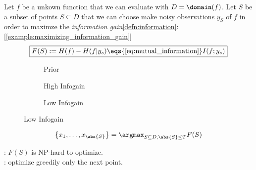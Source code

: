 \begin{sectionbox}\nospacing
  Let $f$ be a unkown function that we can evaluate with $D=\domain(f)$.
  Let $S$ be a subset of points $S\subseteq D$ that we can choose make noisy observations
  $y_{S}$ of $f$ in order to maximze the \textit{information gain}\cref{defn:information}:
  \hfill[\cref{example:maximizing_information_gain}]
  \begin{align}
    \boxed{F(S):=H(f)-H(f|y_s)\eqs{\text{\cref{eq:mutual_information}}}I(f;y_s)}\label{eq:information_gain}
  \end{align}
  \begin{figure}[H]
    \centering
    \begin{subfigure}{0.32\columnwidth}
      \centering{
        \def\svgwidth{100pt}
        \resizebox{\linewidth}{!}{}
      }
      \caption{Prior}
      \label{fig:prior}
    \end{subfigure}%
    \hfil
    \begin{subfigure}{0.32\columnwidth}
      \centering{
        \def\svgwidth{100pt}
        \resizebox{\linewidth}{!}{}
      }
      \caption{High Infogain}
      \label{fig:high}
    \end{subfigure}
    \hfil
    \begin{subfigure}{0.32\columnwidth}
      \centering{
        \def\svgwidth{100pt}
        \resizebox{\linewidth}{!}{}
      }
      \caption{Low Infogain}
      \label{fig:low}
    \end{subfigure}
  \end{figure}
\end{sectionbox}
\begin{defnbox}\nospacing
  \begin{defn}\label{defn:optimal_set_of_labels}
    \begin{align}
      \left\{x_1,\ldots,x_{\abs{S}}\right\}=\argmax_{S\subseteq D,\abs{S}\leq T}F(S)
    \end{align}
  \end{defn}
\end{defnbox}
\begin{sectionbox}\nospacing
  : $F(S)$ is NP-hard to optimize.\\
  : optimize greedily only the next point.
\end{sectionbox}

